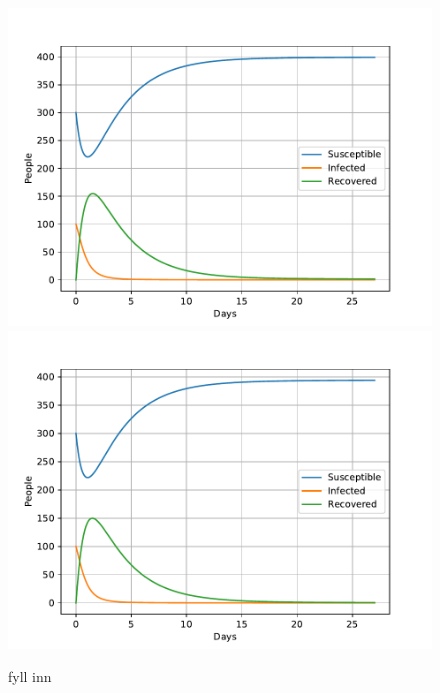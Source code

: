 \documentclass[a4paper]{article}
\begin{document}
\begin{figure}[!htb]
	\includegraphics[scale=0.56]{../plots/opp_c_D0.pdf}
	\includegraphics[scale=0.56]{../plots/opp_c_D1.pdf}	
	\caption{fyll inn}
	\label{opp_c0}
\end{figure}
\end{document}
